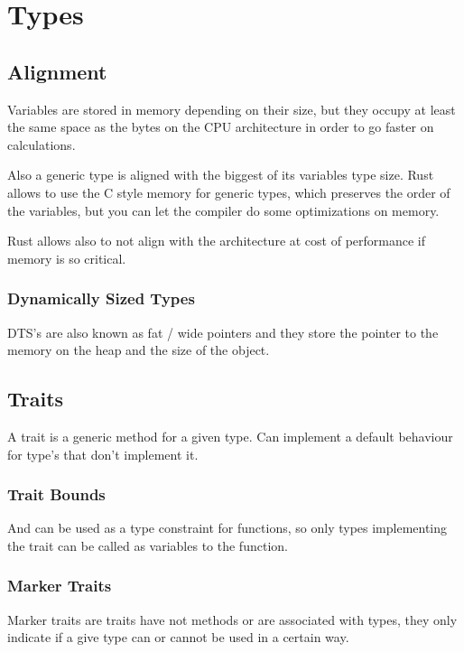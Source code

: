 \section{Types}

\subsection{Alignment}

Variables are stored in memory depending on their size, but they occupy at least the same space as the bytes on the CPU architecture in order to go faster on calculations.

Also a generic type is aligned with the biggest of its variables type size.
Rust allows to use the C style memory for generic types, which preserves the order of the variables, but you can let the compiler do some optimizations on memory.

Rust allows also to not align with the architecture at cost of performance if memory is so critical.

\subsubsection{Dynamically Sized Types}

DTS's are also known as fat / wide pointers and they store the pointer to the memory on the heap and the size of the object.

\subsection{Traits}

A trait is a generic method for a given type. Can implement a default behaviour for type's that don't implement it.

\subsubsection{Trait Bounds}

And can be used as a type constraint for functions, so only types implementing the trait can be called as variables to the function.

\subsubsection{Marker Traits}

Marker traits are traits have not methods or are associated with types, they only indicate if a give type can or cannot be used in a certain way.

